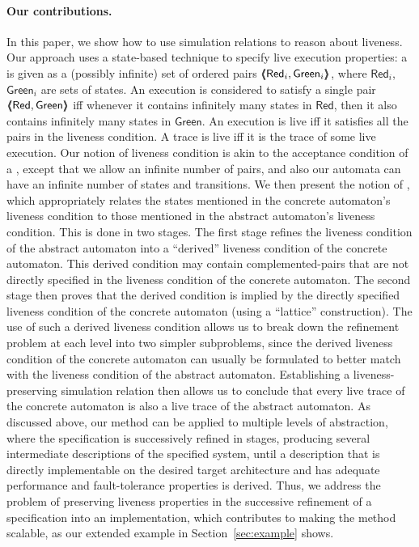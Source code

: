 \documentclass[11pt]{article}
\newcommand{\GREEN}{\mathsf{Green}}
\newcommand{\RED}{\mathsf{Red}}
\newcommand{\pair}[2]{\lpb #1, #2 \rpb}
\newcommand{\lpb}{\langle \hspace{-0.34em} \langle \hspace{-0.34em} \langle}
\newcommand{\rpb}{\rangle \hspace{-0.34em} \rangle \hspace{-0.34em} \rangle}
\begin{document}
\paragraph{Our contributions.}
In this paper, we show how to use simulation relations to reason about
liveness.
Our approach uses a state-based technique to specify live execution 
properties: a  is given as a (possibly infinite) set
of ordered pairs $\pair{\RED_i}{\GREEN_i}$, where $\RED_i$, $\GREEN_i$
are sets of states.
An execution is considered to satisfy a single pair
$\pair{\RED}{\GREEN}$ iff whenever it contains infinitely many states
in $\RED$, then it also contains infinitely many states 
in $\GREEN$.  An execution is live iff it satisfies all the pairs
in the liveness condition. A trace is live iff it is the trace of some
live execution.
Our notion of liveness condition is akin to the acceptance condition
of a 
\cite{AH95,EL85,GL94}, except that we allow an infinite number of pairs,
and also our automata can have an infinite number of states and
transitions. 
We then present the notion of , which appropriately relates the states mentioned in the
concrete automaton's liveness condition to those mentioned in the
abstract automaton's liveness condition.  This is done in two stages.
The first stage refines the liveness condition of the abstract
automaton into a ``derived'' liveness condition of the concrete
automaton.  This derived condition may contain complemented-pairs that
are not directly specified in the liveness condition of the concrete
automaton.  The second stage then proves that the derived condition is
implied by the directly specified liveness condition of the concrete
automaton (using a ``lattice'' construction).  
The use of such a derived liveness condition allows us to
break down the refinement problem at each level into two simpler
subproblems, since the derived liveness condition of the concrete
automaton can usually be formulated to better match with the
liveness condition of the abstract automaton.
Establishing a liveness-preserving simulation relation then allows us
to conclude that every live trace of the concrete automaton is also a
live trace of the abstract automaton.
As discussed above, our method can be applied to multiple levels of
abstraction, where the specification is successively refined in
stages, producing several intermediate descriptions of the specified
system, until a description that is directly implementable on the
desired target architecture and has adequate performance and
fault-tolerance properties is derived.
Thus, we address the problem of preserving liveness properties in the
successive refinement of a specification into an implementation,
which contributes to making the method scalable, as our 
extended example in Section~\ref{sec:example} shows.
\end{document}
